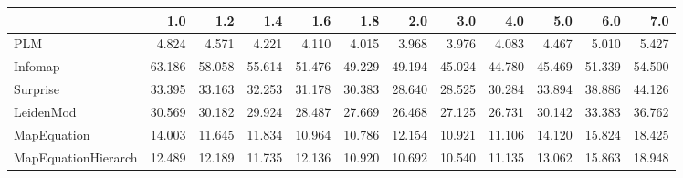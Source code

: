 \begin{tabular}{lrrrrrrrrrrr}
\toprule
{} &    1.0 &    1.2 &    1.4 &    1.6 &    1.8 &    2.0 &    3.0 &    4.0 &    5.0 &    6.0 &    7.0 \\
\midrule
PLM                 &  4.824 &  4.571 &  4.221 &  4.110 &  4.015 &  3.968 &  3.976 &  4.083 &  4.467 &  5.010 &  5.427 \\
Infomap             & 63.186 & 58.058 & 55.614 & 51.476 & 49.229 & 49.194 & 45.024 & 44.780 & 45.469 & 51.339 & 54.500 \\
Surprise            & 33.395 & 33.163 & 32.253 & 31.178 & 30.383 & 28.640 & 28.525 & 30.284 & 33.894 & 38.886 & 44.126 \\
LeidenMod           & 30.569 & 30.182 & 29.924 & 28.487 & 27.669 & 26.468 & 27.125 & 26.731 & 30.142 & 33.383 & 36.762 \\
MapEquation         & 14.003 & 11.645 & 11.834 & 10.964 & 10.786 & 12.154 & 10.921 & 11.106 & 14.120 & 15.824 & 18.425 \\
MapEquationHierarch & 12.489 & 12.189 & 11.735 & 12.136 & 10.920 & 10.692 & 10.540 & 11.135 & 13.062 & 15.863 & 18.948 \\
\bottomrule
\end{tabular}
